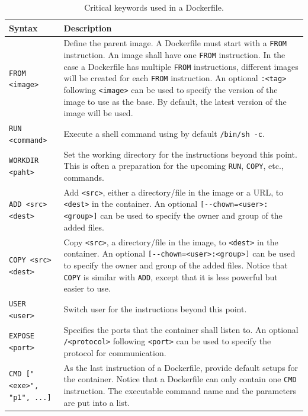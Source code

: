 \begin{table}
	\centering \caption{Critical keywords used in a Dockerfile.}\label{ch:vac:tab:keywordsdockerfile}
	\begin{tabularx}{\textwidth}{lX}
		\hline
		Syntax & Description \\ \hline
		\verb|FROM <image>| & Define the parent image. A Dockerfile must start with a \verb|FROM| instruction. An image shall have one \verb|FROM| instruction. In the case a Dockerfile has multiple \verb|FROM| instructions, different images will be created for each \verb|FROM| instruction. An optional \verb|:<tag>| following \verb|<image>| can be used to specify the version of the image to use as the base. By default, the latest version of the image will be used. \\ \hdashline
		\verb|RUN <command>| & Execute a shell command using by default \verb|/bin/sh -c|. \\ \hdashline
		\verb|WORKDIR <paht>| & Set the working directory for the instructions beyond this point. This is often a preparation for the upcoming \verb|RUN|, \verb|COPY|, etc., commands. \\ \hdashline
		\verb|ADD <src> <dest>| & Add \verb|<src>|, either a directory/file in the image or a URL, to \verb|<dest>| in the container. An optional \verb|[--chown=<user>:<group>]| can be used to specify the owner and group of the added files. \\ \hdashline
		\verb|COPY <src> <dest>| & Copy \verb|<src>|, a directory/file in the image, to \verb|<dest>| in the container. An optional \verb|[--chown=<user>:<group>]| can be used to specify the owner and group of the added files. Notice that \verb|COPY| is similar with \verb|ADD|, except that it is less powerful but easier to use. \\ \hdashline
		\verb|USER <user>| & Switch user for the instructions beyond this point. \\ \hdashline
		\verb|EXPOSE <port>| & Specifies the ports that the container shall listen to. An optional \verb|/<protocol>| following \verb|<port>| can be used to specify the protocol for communication. \\ \hdashline
		\verb|CMD ["<exe>", "p1", ...]| & As the last instruction of a Dockerfile, provide default setups for the container. Notice that a Dockerfile can only contain one \verb|CMD| instruction. The executable command name and the parameters are put into a list. \\
		\hline
	\end{tabularx}
\end{table}

